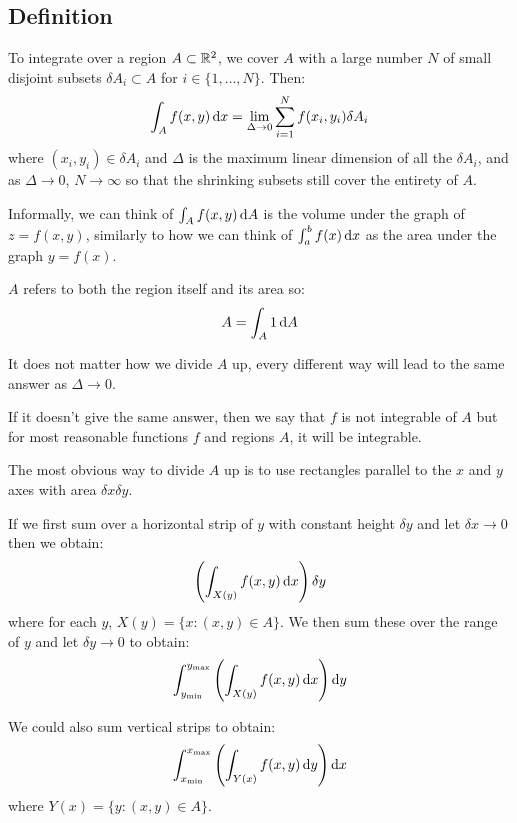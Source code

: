 \documentclass[../main.tex]{subfiles}
\begin{document}
\subsection{Definition}
To integrate over a region $A \subset \mathbb{R}^2$, we cover $A$ with a large number $N$ of small disjoint subsets $\delta A_i \subset A$ for $i \in \{1, \ldots, N\}$.
Then:
\[
  \int_A f(x, y) \d{x} = \lim_{\Delta \to 0} \sum_{i = 1}^{N} f(x_i, y_i) \delta A_i
\]
where $(x_i, y_i) \in \delta A_i$ and $\Delta$ is the maximum linear dimension of all the $\delta A_i$, and as $\Delta \to 0$, $N \to \infty$ so that the shrinking subsets still cover the entirety of $A$.

Informally, we can think of $\int_A f(x, y) \d{A}$ is the volume under the graph of $z = f(x, y)$, similarly to how we can think of $\int_{a}^{b} f(x) \d{x}$ as the area under the graph $y = f(x)$.
\begin{remark}[Note]
  $A$ refers to both the region itself and its area so:
  \[
    A = \int_A 1 \d{A}
  \]
\end{remark}
\begin{remark}
  It does not matter how we divide $A$ up, every different way will lead to the same answer as $\Delta \to 0$.

  If it doesn't give the same answer, then we say that $f$ is not integrable of $A$ but for most reasonable functions $f$ and regions $A$, it will be integrable.
\end{remark}
The most obvious way to divide $A$ up is to use rectangles parallel to the $x$ and $y$ axes with area $\delta x \delta y$.

If we first sum over a horizontal strip of $y$ with constant height $\delta y$ and let $\delta x \to 0$ then we obtain:
\[
  \left(\int_{X(y)} f(x, y) \d{x}\right)\delta y
\]
where for each $y$, $X(y) = \{x: (x, y) \in A\}$.
We then sum these over the range of $y$ and let $\delta y \to 0$ to obtain:
\[
  \int_{y_{\text{min}}}^{y_{\text{max}}} \left(\int_{X(y)} f(x, y) \d{x}\right) \d{y}
\]

We could also sum vertical strips to obtain:
\[
  \int_{x_{\text{min}}}^{x_{\text{max}}} \left(\int_{Y(x)} f(x, y) \d{y}\right) \d{x}
\]
where $Y(x) = \{y: (x, y) \in A\}$.
\end{document}
